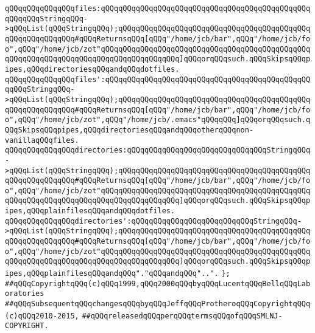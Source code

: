 \newline
\verb|qQQqqQQqqQQqqQQqfiles:qQQqqQQqqQQqqQQqqQQqqQQqqQQqqQQqqQQqqQQqqQQqqQQqqQQqqQQqStringqQQq->qQQqList(qQQqStringqQQq);qQQqqQQqqQQqqQQqqQQqqQQqqQQqqQQqqQQqqQQqqQQqqQQqqQQqqQQqqQQq#qQQqReturnsqQQq[qQQq"/home/jcb/bar",qQQq"/home/jcb/foo",qQQq"/home/jcb/zot"qQQqqQQqqQQqqQQqqQQqqQQqqQQqqQQqqQQqqQQqqQQqqQQqqQQqqQQqqQQqqQQqqQQqqQQqqQQqqQQqqQQqqQQq]qQQqorqQQqsuch.qQQqSkipsqQQqpipes,qQQqdirectoriesqQQqandqQQqdotfiles.|\newline
\verb|qQQqqQQqqQQqqQQqfiles':qQQqqQQqqQQqqQQqqQQqqQQqqQQqqQQqqQQqqQQqqQQqqQQqqQQqStringqQQq->qQQqList(qQQqStringqQQq);qQQqqQQqqQQqqQQqqQQqqQQqqQQqqQQqqQQqqQQqqQQqqQQqqQQqqQQqqQQq#qQQqReturnsqQQq[qQQq"/home/jcb/bar",qQQq"/home/jcb/foo",qQQq"/home/jcb/zot",qQQq"/home/jcb/.emacs"qQQqqQQq]qQQqorqQQqsuch.qQQqSkipsqQQqpipes,qQQqdirectoriesqQQqandqQQqotherqQQqnon-vanillaqQQqfiles.|\newline
\newline
\verb|qQQqqQQqqQQqqQQqdirectories:qQQqqQQqqQQqqQQqqQQqqQQqqQQqqQQqStringqQQq->qQQqList(qQQqStringqQQq);qQQqqQQqqQQqqQQqqQQqqQQqqQQqqQQqqQQqqQQqqQQqqQQqqQQqqQQqqQQq#qQQqReturnsqQQq[qQQq"/home/jcb/bar",qQQq"/home/jcb/foo",qQQq"/home/jcb/zot"qQQqqQQqqQQqqQQqqQQqqQQqqQQqqQQqqQQqqQQqqQQqqQQqqQQqqQQqqQQqqQQqqQQqqQQqqQQqqQQqqQQqqQQq]qQQqorqQQqsuch.qQQqSkipsqQQqpipes,qQQqplainfilesqQQqandqQQqdotfiles.|\newline
\verb|qQQqqQQqqQQqqQQqdirectories':qQQqqQQqqQQqqQQqqQQqqQQqqQQqStringqQQq->qQQqList(qQQqStringqQQq);qQQqqQQqqQQqqQQqqQQqqQQqqQQqqQQqqQQqqQQqqQQqqQQqqQQqqQQqqQQq#qQQqReturnsqQQq[qQQq"/home/jcb/bar",qQQq"/home/jcb/foo",qQQq"/home/jcb/zot"qQQqqQQqqQQqqQQqqQQqqQQqqQQqqQQqqQQqqQQqqQQqqQQqqQQqqQQqqQQqqQQqqQQqqQQqqQQqqQQqqQQqqQQq]qQQqorqQQqsuch.qQQqSkipsqQQqpipes,qQQqplainfilesqQQqandqQQq"."qQQqandqQQq"..".|\newline
\verb|};|\newline
\newline
\newline
\verb|##qQQqCopyrightqQQq(c)qQQq1999,qQQq2000qQQqbyqQQqLucentqQQqBellqQQqLaboratories|\newline
\verb|##qQQqSubsequentqQQqchangesqQQqbyqQQqJeffqQQqProtheroqQQqCopyrightqQQq(c)qQQq2010-2015,|\newline
\verb|##qQQqreleasedqQQqperqQQqtermsqQQqofqQQqSMLNJ-COPYRIGHT.|\newline

